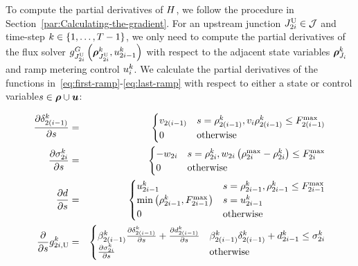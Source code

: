 To compute the partial derivatives of $H$, we follow the procedure
in Section~\ref{par:Calculating-the-gradient}. For an upstream junction
$J_{2i}^{\text{U}}\in\mathcal{J}$ and time-step $k\in\left\{ 1,\ldots,T-1\right\}$,
we only need to compute the partial derivatives of the flux solver
$\god_{\jup{2\link}}\left(\juncstate{\jup{2\link}}{\tind},\ramp_{2\link-1}^{\tind}\right)_{\text{}}$
with respect to the adjacent state variables $\juncstate{\jn_{\link}}{\tind}$
and ramp metering control $u_{i}^{k}$. We calculate the
partial derivatives of the functions in~\eqref{eq:first-ramp}-\eqref{eq:last-ramp}
with respect to either a state or control variable$s\in\state\cup\control$:

\begin{eqnarray*}
\pfrac{\demand_{2\left(\link-1\right)}^{\tind}}s & = & \begin{cases}
\ffspeed_{2\left(i-1\right)} & s=\densitydiscrete{2\left(\link-1\right)}{\tind},\ffspeed_{i}\densitydiscrete{2\left(\link-1\right)}{\tind}\le F_{2\left(i-1\right)}^{\max}\\
0 & \text{otherwise}
\end{cases}\\
\pfrac{\supply_{2\link}^{\tind}}s & = & \begin{cases}
-\congspeed_{2i} & s=\densitydiscrete{2\link}{\tind},\congspeed_{2i}\left(\density_{2i}^{\max}-\densitydiscrete{2\link}{\tind}\right)\le F_{2i}^{\max}\\
0 & \text{otherwise}
\end{cases}\\
\pfrac ds & = & \begin{cases}
\ramp_{2\link-1}^{\tind} & s=\densitydiscrete{2\link-1}{\tind},\densitydiscrete{2\link-1}{\tind}\le F_{2\link-1}^{\max}\\
\min\left(\densitydiscrete{2\link-1}{\tind},F_{2i-1}^{\max}\right) & s=\ramp_{2\link-1}^{\tind}\\
0 & \text{otherwise}
\end{cases}\\
\pfrac{}s\fin{2\link}{\tind} & = & \begin{cases}
\splitratio_{2\left(\link-1\right)}^{\tind}\pfrac{\demand_{2\left(\link-1\right)}^{\tind}}s+\pfrac{\rampDemand_{2\left(\link-1\right)}^{\tind}}s & \splitratio_{2\left(\link-1\right)}^{\tind}\demand_{2\left(\link-1\right)}^{\tind}+\rampDemand_{2\link-1}^{\tind}\le\supply_{2\link}^{\tind}\\
\pfrac{\supply_{2\link}^{\tind}}s & \text{otherwise}
\end{cases}\\

\end{eqnarray*}
